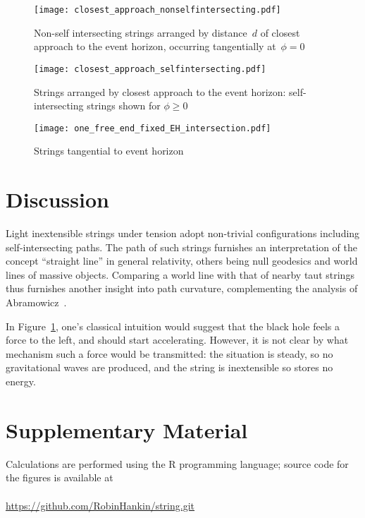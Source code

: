 \documentclass[times,twocolumn,final]{elsarticle}
\begin{document}
\begin{figure}[h!]
\centering
\texttt{[image: closest\_approach\_nonselfintersecting.pdf]}
\caption{Non-self intersecting strings arranged by distance~$d$ of
  closest approach to the event horizon, occurring tangentially
  at~$\phi=0$}
\label{closest_approach_non_self_intersecting}
\end{figure}

\begin{figure}[h!]
\centering
\texttt{[image: closest\_approach\_selfintersecting.pdf]}
\caption{Strings arranged by closest approach to the event horizon:
 self-intersecting strings shown for $\phi\geq 0$}
\label{closest_approach_self_intersecting}
\end{figure}

\begin{figure}[h!]
\centering
\texttt{[image: one\_free\_end\_fixed\_EH\_intersection.pdf]}
\caption{Strings tangential to event horizon}
\label{fixed_EH_intersection}
\end{figure}

\section{Discussion}

Light inextensible strings under tension adopt non-trivial
configurations including self-intersecting paths.  The path of such
strings furnishes an interpretation of the concept ``straight line''
in general relativity, others being null geodesics and world lines of
massive objects.  Comparing a world line with that of nearby taut
strings thus furnishes another insight into path curvature,
complementing the analysis of Abramowicz~\cite{abramowicz1992}.

In Figure~\ref{closest_approach_non_self_intersecting}, one's
classical intuition would suggest that the black hole feels a force to
the left, and should start accelerating.  However, it is not clear by
what mechanism such a force would be transmitted: the situation is
steady, so no gravitational waves are produced, and the string is
inextensible so stores no energy.




\section*{Supplementary Material}

Calculations are performed using the R programming language; source
code for the figures is available at
\\
\\
\url{https://github.com/RobinHankin/string.git}
\end{document}
